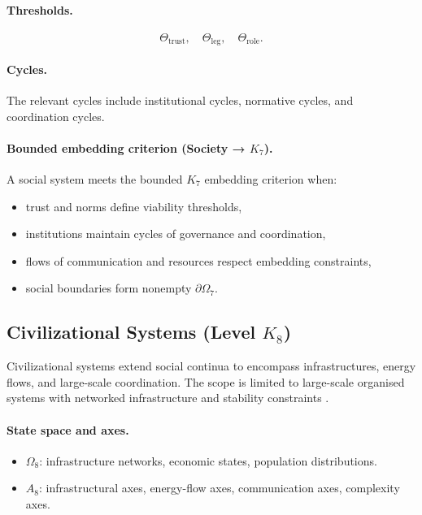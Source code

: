 \paragraph{Thresholds.}
\[
  \Theta_{\mathrm{trust}},\quad
  \Theta_{\mathrm{leg}},\quad
  \Theta_{\mathrm{role}}.
\]

\paragraph{Cycles.}
The relevant cycles include institutional cycles, normative cycles, and
coordination cycles.

\paragraph{Bounded embedding criterion (Society → \texorpdfstring{\(K_7\)}{K7}).}
A social system meets the bounded \(K_7\) embedding criterion when:
\begin{itemize}
  \item trust and norms define viability thresholds,
  \item institutions maintain cycles of governance and coordination,
  \item flows of communication and resources respect embedding constraints,
  \item social boundaries form nonempty \(\partial\Omega_7\).
\end{itemize}

\subsection{Civilizational Systems (Level \texorpdfstring{$K_8$}{K8})}

Civilizational systems extend social continua to encompass infrastructures,
energy flows, and large-scale coordination.
The scope is limited to large-scale organised systems with networked
infrastructure and stability constraints \parencite{newman_networks,may_stability_complexity}.

\paragraph{State space and axes.}
\begin{itemize}
  \item \(\Omega_8\): infrastructure networks, economic states, population
        distributions.
  \item \(A_8\): infrastructural axes, energy-flow axes, communication axes,
        complexity axes.
\end{itemize}

